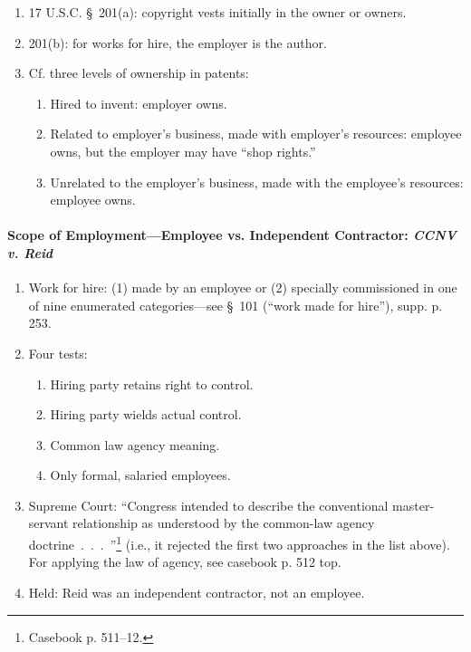 \begin{enumerate}
    \item 17 U.S.C. \S\ 201(a): copyright vests initially in the owner or 
    owners.
    \item 201(b): for works for hire, the employer is the author.
    \item Cf. three levels of ownership in patents:
    \begin{enumerate}
        \item Hired to invent: employer owns.
        \item Related to employer's business, made with employer's resources: 
        employee owns, but the employer may have ``shop rights.''
        \item Unrelated to the employer's business, made with the employee's 
        resources: employee owns.
    \end{enumerate}
\end{enumerate}

\paragraph{Scope of Employment---Employee vs. Independent Contractor: 
\emph{CCNV v. Reid}}

\begin{enumerate}
    \item Work for hire: (1) made by an employee or (2) specially commissioned 
    in one of nine enumerated categories---see \S\ 101 (``work made for 
    hire''), supp. p. 253.
    \item Four tests:
    \begin{enumerate}
        \item Hiring party retains right to control.
        \item Hiring party wields actual control.
        \item Common law agency meaning.
        \item Only formal, salaried employees.
    \end{enumerate}
    \item Supreme Court: ``Congress intended to describe the conventional 
    master-servant relationship as understood by the common-law agency 
    doctrine~.~.~.~''\footnote{Casebook p. 511--12.} (i.e., it rejected the 
    first two approaches in the list above). For applying the law of agency, 
    see casebook p. 512 top.
    \item Held: Reid was an independent contractor, not an employee.
\end{enumerate}

